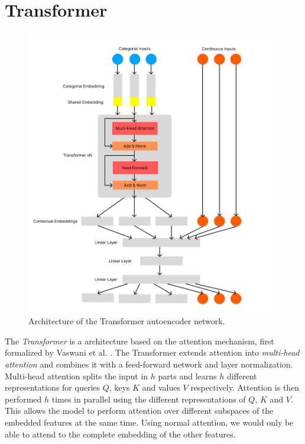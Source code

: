 \section{Transformer}

\begin{figure}
	\includegraphics[width=1.2\linewidth]{transformer_autoencoder.png}
	\caption{Architecture of the Transformer autoencoder network.}
	\label{transformer_autoencoder}
\end{figure}

The \textit{Transformer} is a architecture based on the attention mechanism, first formalized by Vaswani et al. \cite{attention_is_all_you_need}. The Transformer extends attention into \textit{multi-head attention} and combines it with a feed-forward network and layer normalization. Multi-head attention \cite{attention_is_all_you_need} splits the input in $h$ parts and learns $h$ different representations for queries $Q$, keys $K$ and values $V$ respectively. Attention is then performed $h$ times in parallel using the different representations of $Q$, $K$ and $V$. This allows the model to perform attention over different subspaces of the embedded features at the same time. Using normal attention, we would only be able to attend to the complete embedding of the other features.

